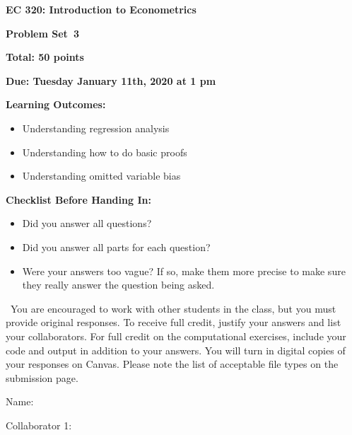 \documentclass[11pt]{article}
\begin{document}
\begin{onehalfspacing}

\begin{center}
\textbf{EC 320: Introduction to Econometrics} \bigskip

\textbf{Problem Set\bigskip\ 3}
\bigskip
\end{center}


\noindent \textbf{Total: 50 points}

\noindent \textbf{Due: Tuesday January 11th, 2020 at 1 pm}

\bigskip


\noindent \textbf{Learning Outcomes:}
\begin{itemize}
\item Understanding regression analysis  
\item Understanding how to do basic proofs
\item Understanding omitted variable bias
\end{itemize}

\bigskip


\noindent \textbf{Checklist Before Handing In:}
\begin{itemize}
\item Did you answer all questions?
\item Did you answer all parts for each question?
\item Were your answers too vague? If so, make them more precise to make sure they really answer the question being asked.
\end{itemize}

\bigskip

\ You are encouraged to work with other students in the class, but you must provide original responses. To receive full credit, justify your answers and list your collaborators. For full credit on the computational exercises, include your code and output in addition to your answers. You will turn in digital copies of your responses on Canvas. Please note the list of acceptable file types on the submission page. \\
\vspace{0.1in}

Name: 			\\
\vspace{0.1in}

Collaborator 1: \\

\vspace{0.1in}


\end{onehalfspacing}
\end{document}
